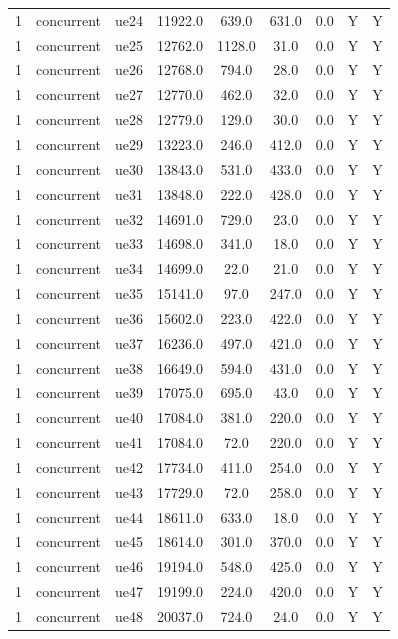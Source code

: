 \begin{table}[ht]
\begin{tabular}{|c|c|c|c|c|c|c|c|c|}
1 & concurrent & ue24 & 11922.0 & 639.0 & 631.0 & 0.0 & Y & Y \\
1 & concurrent & ue25 & 12762.0 & 1128.0 & 31.0 & 0.0 & Y & Y \\
1 & concurrent & ue26 & 12768.0 & 794.0 & 28.0 & 0.0 & Y & Y \\
1 & concurrent & ue27 & 12770.0 & 462.0 & 32.0 & 0.0 & Y & Y \\
1 & concurrent & ue28 & 12779.0 & 129.0 & 30.0 & 0.0 & Y & Y \\
1 & concurrent & ue29 & 13223.0 & 246.0 & 412.0 & 0.0 & Y & Y \\
1 & concurrent & ue30 & 13843.0 & 531.0 & 433.0 & 0.0 & Y & Y \\
1 & concurrent & ue31 & 13848.0 & 222.0 & 428.0 & 0.0 & Y & Y \\
1 & concurrent & ue32 & 14691.0 & 729.0 & 23.0 & 0.0 & Y & Y \\
1 & concurrent & ue33 & 14698.0 & 341.0 & 18.0 & 0.0 & Y & Y \\
1 & concurrent & ue34 & 14699.0 & 22.0 & 21.0 & 0.0 & Y & Y \\
1 & concurrent & ue35 & 15141.0 & 97.0 & 247.0 & 0.0 & Y & Y \\
1 & concurrent & ue36 & 15602.0 & 223.0 & 422.0 & 0.0 & Y & Y \\
1 & concurrent & ue37 & 16236.0 & 497.0 & 421.0 & 0.0 & Y & Y \\
1 & concurrent & ue38 & 16649.0 & 594.0 & 431.0 & 0.0 & Y & Y \\
1 & concurrent & ue39 & 17075.0 & 695.0 & 43.0 & 0.0 & Y & Y \\
1 & concurrent & ue40 & 17084.0 & 381.0 & 220.0 & 0.0 & Y & Y \\
1 & concurrent & ue41 & 17084.0 & 72.0 & 220.0 & 0.0 & Y & Y \\
1 & concurrent & ue42 & 17734.0 & 411.0 & 254.0 & 0.0 & Y & Y \\
1 & concurrent & ue43 & 17729.0 & 72.0 & 258.0 & 0.0 & Y & Y \\
1 & concurrent & ue44 & 18611.0 & 633.0 & 18.0 & 0.0 & Y & Y \\
1 & concurrent & ue45 & 18614.0 & 301.0 & 370.0 & 0.0 & Y & Y \\
1 & concurrent & ue46 & 19194.0 & 548.0 & 425.0 & 0.0 & Y & Y \\
1 & concurrent & ue47 & 19199.0 & 224.0 & 420.0 & 0.0 & Y & Y \\
1 & concurrent & ue48 & 20037.0 & 724.0 & 24.0 & 0.0 & Y & Y \\

\end{tabular}
\end{table}
